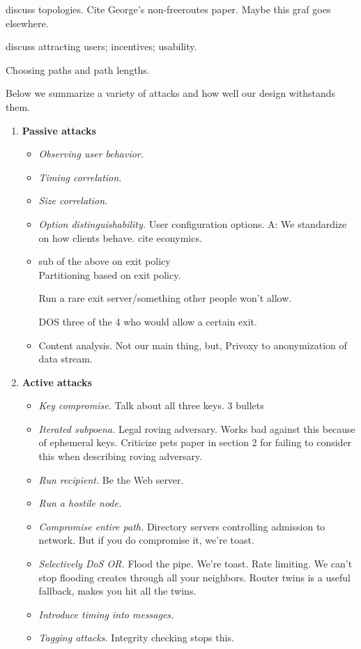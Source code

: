 \documentclass[times,10pt,twocolumn]{article}
\begin{document}
discuss topologies. Cite George's non-freeroutes paper.  Maybe this
graf goes elsewhere.

discuss attracting users; incentives; usability.

Choosing paths and path lengths.


\label{sec:attacks}

Below we summarize a variety of attacks and how well our design withstands
them.

\begin{enumerate}
\item \textbf{Passive attacks}
\begin{itemize}
\item \emph{Observing user behavior.}
\item \emph{Timing correlation.}
\item \emph{Size correlation.}
\item \emph{Option distinguishability.} User configuration options.
A: We standardize on how clients behave. cite econymics.

\item sub of the above on exit policy\\
Partitioning based on exit policy.

Run a rare exit server/something other people won't allow.

DOS three of the 4 who would allow a certain exit.

\item Content analysis. Not our main thing, but, Privoxy to
  anonymization of data stream.


\end{itemize}

\item \textbf{Active attacks}
\begin{itemize}
\item \emph{Key compromise.} Talk about all three keys. 3 bullets
\item \emph{Iterated subpoena.} Legal roving adversary. Works bad against
this because of ephemeral keys. Criticize pets paper in section 2 for
failing to consider this when describing roving adversary.
\item \emph{Run recipient.} Be the Web server.
\item \emph{Run a hostile node.} 
\item \emph{Compromise entire path.} Directory servers controlling admission
to network. But if you do compromise it, we're toast.
\item \emph{Selectively DoS OR.} Flood the pipe. We're toast. Rate limiting.
We can't stop flooding creates through all your neighbors. Router twins
is a useful fallback, makes you hit all the twins.
\item \emph{Introduce timing into messages.}
\item \emph{Tagging attacks.}
Integrity checking stops this.


\end{itemize}
\end{enumerate}
\end{document}
